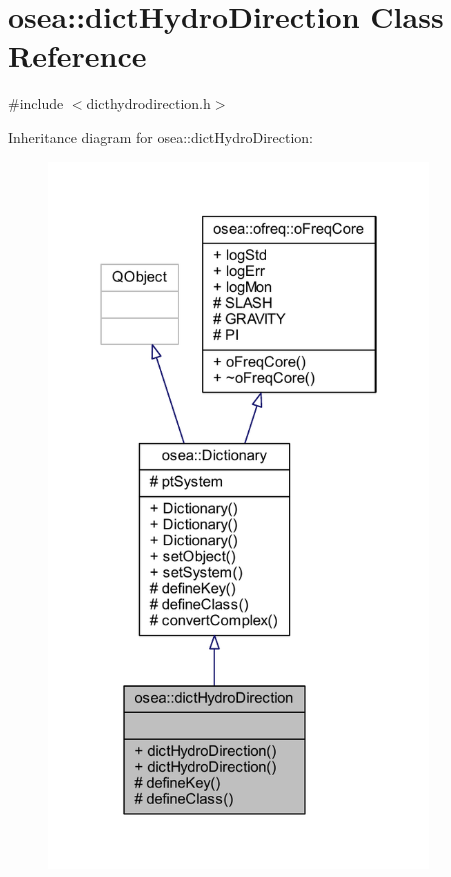 \hypertarget{classosea_1_1dict_hydro_direction}{\section{osea\-:\-:dict\-Hydro\-Direction Class Reference}
\label{classosea_1_1dict_hydro_direction}
}


{\ttfamily \#include $<$dicthydrodirection.\-h$>$}



Inheritance diagram for osea\-:\-:dict\-Hydro\-Direction\-:
\nopagebreak
\begin{figure}[H]
\begin{center}
\leavevmode
\includegraphics[width=286pt]{classosea_1_1dict_hydro_direction__inherit__graph}
\end{center}
\end{figure}
